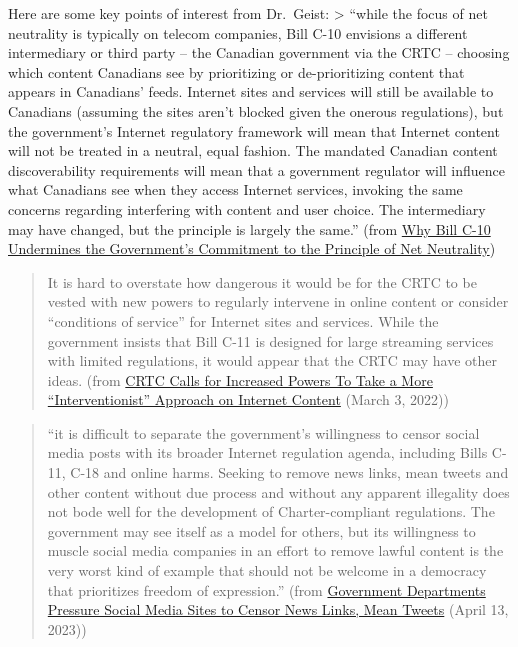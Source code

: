 \documentclass[
]{book}
\theoremstyle{definition}
\theoremstyle{definition}
\theoremstyle{definition}
\theoremstyle{definition}
\theoremstyle{remark}
\begin{document}
\begin{reflect}
Here are some key points of interest from Dr.~Geist:
\textgreater{} ``while the focus of net neutrality is typically on telecom companies, Bill C-10 envisions a different intermediary or third party -- the Canadian government via the CRTC -- choosing which content Canadians see by prioritizing or de-prioritizing content that appears in Canadians' feeds. Internet sites and services will still be available to Canadians (assuming the sites aren't blocked given the onerous regulations), but the government's Internet regulatory framework will mean that Internet content will not be treated in a neutral, equal fashion. The mandated Canadian content discoverability requirements will mean that a government regulator will influence what Canadians see when they access Internet services, invoking the same concerns regarding interfering with content and user choice. The intermediary may have changed, but the principle is largely the same.'' (from \href{https://www.michaelgeist.ca/2021/05/why-bill-c-10-undermines-the-governments-commitment-to-the-principle-of-net-neutrality/}{Why Bill C-10 Undermines the Government's Commitment to the Principle of Net Neutrality})

\begin{quote}
It is hard to overstate how dangerous it would be for the CRTC to be vested with new powers to regularly intervene in online content or consider ``conditions of service'' for Internet sites and services. While the government insists that Bill C-11 is designed for large streaming services with limited regulations, it would appear that the CRTC may have other ideas. (from \href{https://www.michaelgeist.ca/2022/03/crtc-calls-for-more-powers-to-take-a-more-interventionist-approach-on-internet-content/}{CRTC Calls for Increased Powers To Take a More ``Interventionist'' Approach on Internet Content} (March 3, 2022))
\end{quote}

\begin{quote}
``it is difficult to separate the government's willingness to censor social media posts with its broader Internet regulation agenda, including Bills C-11, C-18 and online harms. Seeking to remove news links, mean tweets and other content without due process and without any apparent illegality does not bode well for the development of Charter-compliant regulations. The government may see itself as a model for others, but its willingness to muscle social media companies in an effort to remove lawful content is the very worst kind of example that should not be welcome in a democracy that prioritizes freedom of expression.'' (from \href{https://www.michaelgeist.ca/2023/04/government-departments-pressure-social-media-sites-to-censor-news-links-mean-tweets/}{Government Departments Pressure Social Media Sites to Censor News Links, Mean Tweets} (April 13, 2023))
\end{quote}


\end{reflect}
\end{document}
